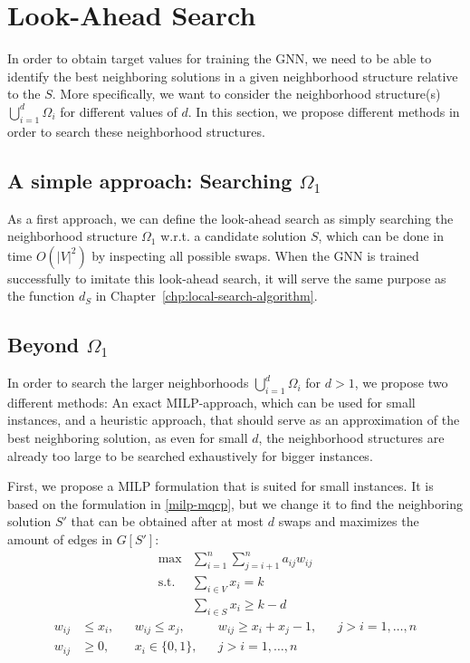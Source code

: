 \documentclass[draft,final]{vutinfth} %
\begin{document}
\section{Look-Ahead Search}\label{sec:lookahead-search}

In order to obtain target values for training the GNN, we need to be able to identify the best neighboring solutions in a given neighborhood structure relative to the $S$. More specifically, we want to consider the neighborhood structure(s) $\bigcup_{i=1}^d \Omega_i$ for different values of $d$. In this section, we propose different methods in order to search these neighborhood structures. 

\subsection{A simple approach: Searching $\Omega_1$}

As a first approach, we can define the look-ahead search as simply searching the neighborhood structure $\Omega_1$ w.r.t. a candidate solution $S$, which can be done in time $O(|V|^2)$ by inspecting all possible swaps. 
When the GNN is trained successfully to imitate this look-ahead search, it will serve the same purpose as the function $d_S$ in Chapter~\ref{chp:local-search-algorithm}. 

\subsection{Beyond $\Omega_1$}

In order to search the larger neighborhoods $\bigcup_{i=1}^d \Omega_i$ for $d > 1$, we propose two different methods: An exact MILP-approach, which can be used for small instances, and a heuristic approach, that should serve as an approximation of the best neighboring solution, as even for small $d$, the neighborhood structures are already too large to be searched exhaustively for bigger instances. 

First, we propose a MILP formulation that is suited for small instances. 
It is based on the formulation in \ref{milp-mqcp}, but we change it to find the neighboring solution $S'$ that can be obtained after at most $d$ swaps and maximizes the amount of edges in $G[S']$: 
\begin{align}
    \max & \sum_{i=1}^n \sum_{j=i+1}^n a_{ij} w_{ij} \\
    \text{s.t. } & \sum_{i \in V} x_i = k \\
     & \sum_{i \in S} x_i \geq k - d    
\end{align}
\begin{align}
    w_{ij} &\leq x_i, & & w_{ij} \leq x_j, & & w_{ij} \geq x_i + x_j - 1, & & j > i=1, \dots , n \\
    w_{ij} &\geq 0,   & & x_i \in \{0,1\}, & & j > i = 1, \dots, n        & & 
\end{align}
\end{document}

